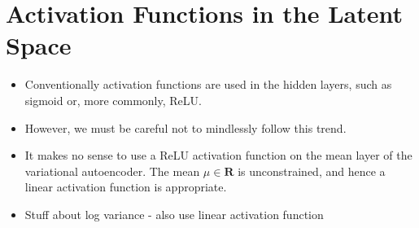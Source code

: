 %
%
%
%
%
\section{Activation Functions in the Latent Space}
\begin{itemize}
\item Conventionally activation functions are used in the hidden layers, such as sigmoid or, more commonly, ReLU.
\item However, we must be careful not to mindlessly follow this trend.
\item It makes no sense to use a ReLU activation function on the mean layer of the variational autoencoder. The mean $\mu \in \mathbf{R}$ is unconstrained, and hence a linear activation function is appropriate.
\item Stuff about log variance - also use linear activation function
\end{itemize}